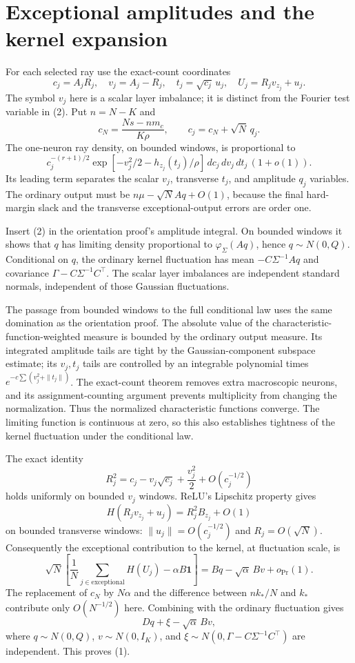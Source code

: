 \documentclass[11pt]{article}
\begin{document}
\section{Exceptional amplitudes and the kernel expansion}
For each selected ray use the exact-count coordinates
\[
 c_j=A_jR_j,\quad v_j=A_j-R_j,\quad t_j=\sqrt{c_j}\,u_j,
 \quad U_j=R_jv_{z_j}+u_j.
\]
The symbol $v_j$ here is a scalar layer imbalance; it is distinct from
the Fourier test variable in (2). Put $n=N-K$ and
\[
 c_N=\frac{Ns-nm_c}{K\rho},\qquad c_j=c_N+\sqrt N\,q_j.
\]
The one-neuron ray density, on bounded windows, is proportional to
\[
 c_j^{-(r+1)/2}\exp[-v_j^2/2-h_{z_j}(t_j)/\rho]
                         \,dc_j\,dv_j\,dt_j\,(1+o(1)).
\]
Its leading term separates the scalar $v_j$, transverse $t_j$, and
amplitude $q_j$ variables. The ordinary output must be
$n\mu-\sqrt N A q+O(1)$, because the final hard-margin slack and the
transverse exceptional-output errors are order one.

Insert (2) in the orientation proof's amplitude integral. On bounded
windows it shows that $q$ has limiting density proportional to
$\varphi_\Sigma(Aq)$, hence $q\sim N(0,Q)$. Conditional on $q$, the
ordinary kernel fluctuation has mean $-C\Sigma^{-1}Aq$ and covariance
$\Gamma-C\Sigma^{-1}C^\top$. The scalar layer imbalances are independent
standard normals, independent of those Gaussian fluctuations.

The passage from bounded windows to the full conditional law uses the
same domination as the orientation proof. The absolute value of the
characteristic-function-weighted measure is bounded by the ordinary
output measure. Its integrated amplitude tails are tight by the
Gaussian-component subspace estimate; its $v_j,t_j$ tails are controlled
by an integrable polynomial times $e^{-c\sum(v_j^2+\|t_j\|)}$.
The exact-count theorem removes extra macroscopic neurons, and its
assignment-counting argument prevents multiplicity from changing the
normalization. Thus the normalized characteristic functions converge.
The limiting function is continuous at zero, so this also establishes
tightness of the kernel fluctuation under the conditional law.

The exact identity
\[
 R_j^2=c_j-v_j\sqrt{c_j}+\frac{v_j^2}{2}+O(c_j^{-1/2})
\]
holds uniformly on bounded $v_j$ windows. ReLU's Lipschitz property gives
\[
 H(R_jv_{z_j}+u_j)=R_j^2B_{z_j}+O(1)
\]
on bounded transverse windows: $\|u_j\|=O(c_j^{-1/2})$ and
$R_j=O(\sqrt N)$. Consequently the exceptional contribution to the
kernel, at fluctuation scale, is
\[
 \sqrt N\left[\frac1N\sum_{j\in\mathrm{exceptional}}H(U_j)
                  -\alpha B\boldsymbol1\right]
                 =Bq-\sqrt\alpha\,Bv+o_{\Pr}(1).
\]
The replacement of $c_N$ by $N\alpha$ and the difference between
$n k_*/N$ and $k_*$ contribute only $O(N^{-1/2})$ here.
Combining with the ordinary fluctuation gives
\[
 Dq+\xi-\sqrt\alpha\,Bv,
\]
where $q\sim N(0,Q)$, $v\sim N(0,I_K)$, and
$\xi\sim N(0,\Gamma-C\Sigma^{-1}C^\top)$ are independent. This
proves (1).
\end{document}
